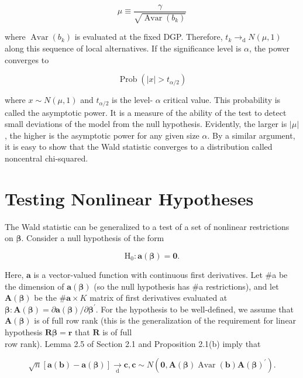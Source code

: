 \documentclass[10pt]{article}
\begin{document}
\begin{equation*}
\mu \equiv \frac{\gamma}{\sqrt{\operatorname{Avar}\left(b_{k}\right)}} \tag{2.4.5}
\end{equation*}


where $\operatorname{Avar}\left(b_{k}\right)$ is evaluated at the fixed DGP. Therefore, $t_{k} \rightarrow_{\mathrm{d}} N(\mu, 1)$ along this sequence of local alternatives. If the significance level is $\alpha$, the power converges to


\begin{equation*}
\operatorname{Prob}\left(|x|>t_{\alpha / 2}\right) \tag{2.4.6}
\end{equation*}


where $x \sim N(\mu, 1)$ and $t_{\alpha / 2}$ is the level- $\alpha$ critical value. This probability is called the asymptotic power. It is a measure of the ability of the test to detect small deviations of the model from the null hypothesis. Evidently, the larger is $|\mu|$, the higher is the asymptotic power for any given size $\alpha$. By a similar argument, it is easy to show that the Wald statistic converges to a distribution called noncentral chi-squared.

\section*{Testing Nonlinear Hypotheses}
The Wald statistic can be generalized to a test of a set of nonlinear restrictions on $\boldsymbol{\beta}$. Consider a null hypothesis of the form

$$
\mathrm{H}_{0}: \mathbf{a}(\boldsymbol{\beta})=\mathbf{0} .
$$

Here, $\mathbf{a}$ is a vector-valued function with continuous first derivatives. Let \#a be the dimension of $\mathbf{a}(\boldsymbol{\beta})$ (so the null hypothesis has \#a restrictions), and let $\mathbf{A}(\boldsymbol{\beta})$ be the $\# \mathbf{a} \times K$ matrix of first derivatives evaluated at $\boldsymbol{\beta}: \mathbf{A}(\boldsymbol{\beta})=\partial \mathbf{a}(\boldsymbol{\beta}) / \partial \boldsymbol{\beta}^{\prime}$. For the hypothesis to be well-defined, we assume that $\mathbf{A}(\boldsymbol{\beta})$ is of full row rank (this is the generalization of the requirement for linear hypothesis $\mathbf{R} \boldsymbol{\beta}=\mathbf{r}$ that $\mathbf{R}$ is of full\\
row rank). Lemma 2.5 of Section 2.1 and Proposition 2.1(b) imply that


\begin{equation*}
\sqrt{n}[\mathbf{a}(\mathbf{b})-\mathbf{a}(\boldsymbol{\beta})] \underset{\mathrm{d}}{\rightarrow} \mathbf{c}, \mathbf{c} \sim N\left(\mathbf{0}, \mathbf{A}(\boldsymbol{\beta}) \operatorname{Avar}(\mathbf{b}) \mathbf{A}(\boldsymbol{\beta})^{\prime}\right) . \tag{2.4.7}
\end{equation*}
\end{document}
